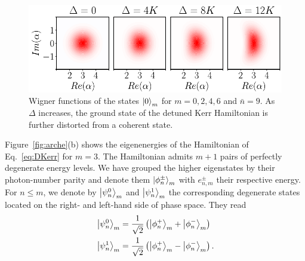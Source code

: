 \documentclass[%
 reprint,
 superscriptaddress,
 amsmath,
 amssymb,
 aps,
 pra,
 10pt
]{revtex4-2}
\newcommand{\nbar}{\bar{n}}
\begin{document}
\begin{figure}[t!]
    \centering
    \includegraphics[width=\columnwidth]{image/Banane_V2.pdf}
    \vspace{-0.5cm}
    \caption{\label{fig:wigner}
    Wigner functions of the states $\ket{0}_{m}$ for $m=0,2,4,6$ and $\nbar = 9$. As $\Delta$ increases, the ground state of the detuned Kerr Hamiltonian is further distorted from a coherent state.}
\end{figure}

Figure~\ref{fig:arche}(b) shows the eigenenergies of the Hamiltonian of Eq.~\eqref{eq:DKerr} for $m=3$. The Hamiltonian admits $m +1$  pairs of perfectly degenerate energy levels. We have grouped the higher eigenstates by their photon-number parity and denote them $\ket{\phi_n^\pm}_m$ with $e^\pm_{n,m}$ their respective energy. For $n \le m$, we denote by $\ket{\psi^0_n}_m$ and $\ket{\psi^1_n}_m$ the corresponding degenerate states located on the right- and left-hand side of phase space. They read
\begin{equation}
    \begin{split}
        &\ket{\psi^0_n}_m =\frac{1}{\sqrt{2}}\left(\ket{{\phi}_n^+}_m+\ket{{\phi}_n^-}_m\right) \\
        &\ket{\psi^1_n}_m =\frac{1}{\sqrt{2}}\left(\ket{{\phi}_n^+}_m-\ket{{\phi}_n^-}_m\right).
    \end{split}
\end{equation} 
\end{document}
